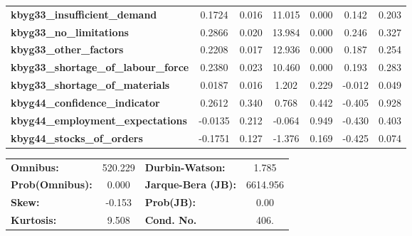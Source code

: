 \begin{center}
\begin{tabular}{lcccccc}
\textbf{kbyg33\_insufficient\_demand}        &       0.1724  &        0.016     &    11.015  &         0.000        &        0.142    &        0.203     \\
\textbf{kbyg33\_no\_limitations}             &       0.2866  &        0.020     &    13.984  &         0.000        &        0.246    &        0.327     \\
\textbf{kbyg33\_other\_factors}              &       0.2208  &        0.017     &    12.936  &         0.000        &        0.187    &        0.254     \\
\textbf{kbyg33\_shortage\_of\_labour\_force} &       0.2380  &        0.023     &    10.460  &         0.000        &        0.193    &        0.283     \\
\textbf{kbyg33\_shortage\_of\_materials}     &       0.0187  &        0.016     &     1.202  &         0.229        &       -0.012    &        0.049     \\
\textbf{kbyg44\_confidence\_indicator}       &       0.2612  &        0.340     &     0.768  &         0.442        &       -0.405    &        0.928     \\
\textbf{kbyg44\_employment\_expectations}    &      -0.0135  &        0.212     &    -0.064  &         0.949        &       -0.430    &        0.403     \\
\textbf{kbyg44\_stocks\_of\_orders}          &      -0.1751  &        0.127     &    -1.376  &         0.169        &       -0.425    &        0.074     \\
\bottomrule
\end{tabular}
\begin{tabular}{lclc}
\textbf{Omnibus:}       & 520.229 & \textbf{  Durbin-Watson:     } &    1.785  \\
\textbf{Prob(Omnibus):} &   0.000 & \textbf{  Jarque-Bera (JB):  } & 6614.956  \\
\textbf{Skew:}          &  -0.153 & \textbf{  Prob(JB):          } &     0.00  \\
\textbf{Kurtosis:}      &   9.508 & \textbf{  Cond. No.          } &     406.  \\
\bottomrule
\end{tabular}
\end{center}